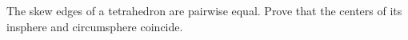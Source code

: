 The skew edges of a tetrahedron are pairwise equal. Prove that the centers of its insphere and circumsphere coincide.
